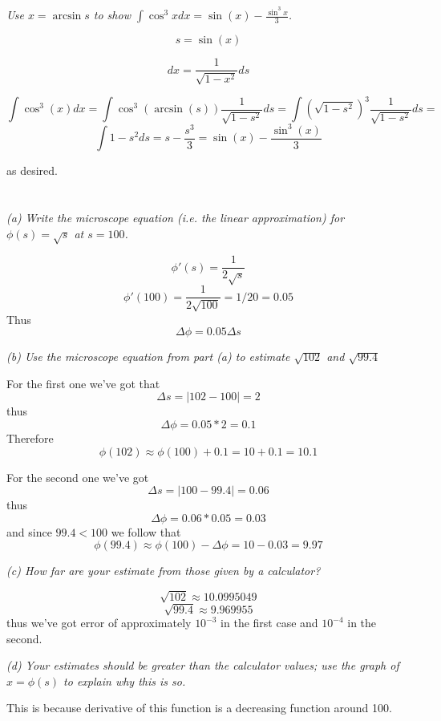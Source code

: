 \documentclass[11pt,oneside,titlepage]{book}
\begin{document}
\section{}

\textit{Use $x = \arcsin s$ to show $\int {\cos^3 x dx} = \sin(x) - \frac{\sin^3 x}{3}$.}

$$s = \sin(x)$$

$$dx = \frac{1}{\sqrt{1 - x^2}}ds$$

$$\int{\cos^3 (x) dx} = \int{\cos^3 (\arcsin(s)) \frac{1}{\sqrt{1 - s^2}} ds} =
\int{(\sqrt{1 - s^2})^3 \frac{1}{\sqrt{1 - s^2}} ds} =
$$
$$
\int{1 - s^2 ds} = s - \frac{s^3}{3} = \sin(x) - \frac{\sin^3(x)}{3}
$$

as desired.

\section{}

\textit{(a) Write the microscope equation (i.e. the linear approximation) for
  $\phi(s) = \sqrt{s}$ at $s = 100$.}

$$\phi'(s) = \frac{1}{2 \sqrt{s}}$$
$$\phi'(100) = \frac{1}{2 \sqrt{100}} = 1/20 = 0.05$$
Thus
$$\Delta \phi = 0.05 \Delta s$$

\textit{(b) Use the microscope equation from part (a) to estimate $\sqrt{102}$ and $\sqrt{99.4}$}

For the first one we've got that
$$\Delta s = |102 - 100| = 2$$
thus
$$\Delta \phi = 0.05 * 2 = 0.1$$
Therefore
$$\phi(102) \approx \phi(100) + 0.1 = 10 + 0.1 = 10.1$$

For the second one we've got
$$\Delta s = |100 - 99.4| = 0.06$$
thus
$$\Delta \phi = 0.06 * 0.05 = 0.03$$
and since $99.4 < 100$ we follow that
$$\phi(99.4) \approx \phi(100) - \Delta \phi = 10 - 0.03 = 9.97$$

\textit{(c) How far are your estimate from those given by a calculator?}

$$\sqrt{102} \approx 10.0995049$$
$$\sqrt{99.4} \approx 9.969955$$
thus we've got  error of approximately $10^{-3}$ in the first case and $10^{-4}$ in the second.

\textit{(d) Your estimates should be greater than the calculator values; use the graph of
  $x = \phi(s)$ to explain why this is so.}

This is because derivative of this function is a  decreasing function around 100.

\section{}
\end{document}
